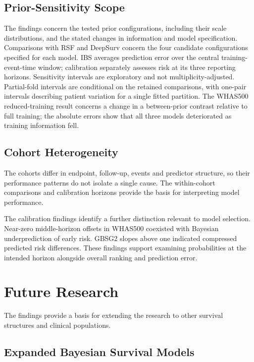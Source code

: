 \subsection{Prior-Sensitivity Scope}\label{prior-sensitivity-scope}

The findings concern the tested prior configurations, including their scale distributions, and the stated changes in information and model specification. Comparisons with RSF and DeepSurv concern the four candidate configurations specified for each model. IBS averages prediction error over the central training-event-time window; calibration separately assesses risk at its three reporting horizons. Sensitivity intervals are exploratory and not multiplicity-adjusted. Partial-fold intervals are conditional on the retained comparisons, with one-pair intervals describing patient variation for a single fitted partition. The WHAS500 reduced-training result concerns a change in a between-prior contrast relative to full training; the absolute errors show that all three models deteriorated as training information fell.

\subsection{Cohort Heterogeneity}\label{cohort-heterogeneity}

The cohorts differ in endpoint, follow-up, events and predictor structure, so their performance patterns do not isolate a single cause. The within-cohort comparisons and calibration horizons provide the basis for interpreting model performance.

The calibration findings identify a further distinction relevant to model selection. Near-zero middle-horizon offsets in WHAS500 coexisted with Bayesian underprediction of early risk. GBSG2 slopes above one indicated compressed predicted risk differences. These findings support examining probabilities at the intended horizon alongside overall ranking and prediction error.

\section{Future Research}\label{future-research}

The findings provide a basis for extending the research to other survival structures and clinical populations.

\subsection{Expanded Bayesian Survival Models}\label{expanded-bayesian-survival-models}

